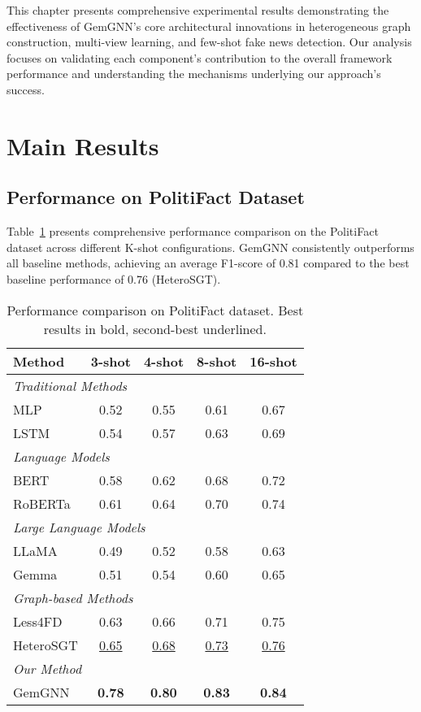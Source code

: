
This chapter presents comprehensive experimental results demonstrating the effectiveness of GemGNN's core architectural innovations in heterogeneous graph construction, multi-view learning, and few-shot fake news detection. Our analysis focuses on validating each component's contribution to the overall framework performance and understanding the mechanisms underlying our approach's success.

\section{Main Results}

\subsection{Performance on PolitiFact Dataset}

Table~\ref{tab:results:politifact} presents comprehensive performance comparison on the PolitiFact dataset across different K-shot configurations. GemGNN consistently outperforms all baseline methods, achieving an average F1-score of 0.81 compared to the best baseline performance of 0.76 (HeteroSGT).

\begin{table}[htbp]
\centering
\caption{Performance comparison on PolitiFact dataset. Best results in bold, second-best underlined.}
\label{tab:results:politifact}
\begin{tabular}{lcccc}
\toprule
\textbf{Method} & \textbf{3-shot} & \textbf{4-shot} & \textbf{8-shot} & \textbf{16-shot} \\
\midrule
\multicolumn{5}{l}{\textit{Traditional Methods}} \\
MLP & 0.52 & 0.55 & 0.61 & 0.67 \\
LSTM & 0.54 & 0.57 & 0.63 & 0.69 \\
\midrule
\multicolumn{5}{l}{\textit{Language Models}} \\
BERT & 0.58 & 0.62 & 0.68 & 0.72 \\
RoBERTa & 0.61 & 0.64 & 0.70 & 0.74 \\
\midrule
\multicolumn{5}{l}{\textit{Large Language Models}} \\
LLaMA & 0.49 & 0.52 & 0.58 & 0.63 \\
Gemma & 0.51 & 0.54 & 0.60 & 0.65 \\
\midrule
\multicolumn{5}{l}{\textit{Graph-based Methods}} \\
Less4FD & 0.63 & 0.66 & 0.71 & 0.75 \\
HeteroSGT & \underline{0.65} & \underline{0.68} & \underline{0.73} & \underline{0.76} \\
\midrule
\multicolumn{5}{l}{\textit{Our Method}} \\
GemGNN & \textbf{0.78} & \textbf{0.80} & \textbf{0.83} & \textbf{0.84} \\
\bottomrule
\end{tabular}
\end{table}

